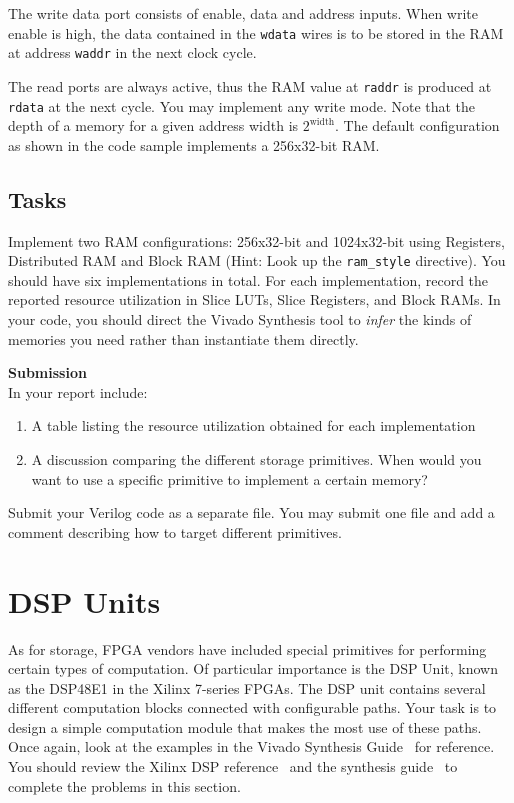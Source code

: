 \documentclass{article}
\begin{document}
The write data port consists of enable, data and address inputs. When write enable is high, the data contained in the \verb|wdata| wires is to be stored in the RAM at address \verb|waddr| in the next clock cycle.

The read ports are always active, thus the RAM value at \verb|raddr| is produced at \verb|rdata| at the next cycle.
You may implement any write mode.
Note that the depth of a memory for a given address width is $2^{\text{width}}$.
The default configuration as shown in the code sample implements a 256x32-bit RAM.

\subsection{Tasks}

Implement two RAM configurations: 256x32-bit and 1024x32-bit using Registers, Distributed RAM and Block RAM (Hint: Look up the \verb|ram_style| directive).
You should have six implementations in total.
For each implementation, record the reported resource utilization in Slice LUTs, Slice Registers, and Block RAMs.
In your code, you should direct the Vivado Synthesis tool to \emph{infer} the kinds of memories you need rather than instantiate them directly.

\begin{minipage}{\textwidth}
\noindent\textbf{Submission}\\
In your report include:
\begin{enumerate}
\item A table listing the resource utilization obtained for each implementation
\item A discussion comparing the different storage primitives. When would you want to use a specific primitive to implement a certain memory? 
\end{enumerate}
Submit your Verilog code as a separate file. You may submit one file and add a comment describing how to target different primitives.
\end{minipage}
\section{DSP Units}

As for storage, FPGA vendors have included special primitives for performing certain types of computation.
Of particular importance is the DSP Unit, known as the DSP48E1 in the Xilinx 7-series FPGAs.
The DSP unit contains several different computation blocks connected with configurable paths.
Your task is to design a simple computation module that makes the most use of these paths.
Once again, look at the examples in the Vivado Synthesis Guide~\cite{xilinxsynth} for reference.
You should review the Xilinx DSP reference~\cite{xilinxdsp} and the synthesis guide~\cite{xilinxsynth} to complete the problems in this section.
\end{document}
